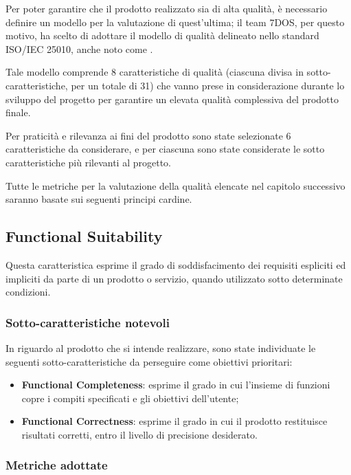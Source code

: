 Per poter garantire che il prodotto realizzato sia di alta qualità, è necessario definire un modello per la valutazione di quest'ultima; il team 7DOS, per questo motivo, ha scelto di adottare il modello di qualità delineato nello standard ISO/IEC 25010, anche noto come .

Tale modello comprende 8 caratteristiche di qualità (ciascuna divisa in sotto-caratteristiche, per un totale di 31) che vanno prese in considerazione durante lo sviluppo del progetto per garantire un elevata qualità complessiva del prodotto finale.

Per praticità e rilevanza ai fini del prodotto sono state selezionate 6 caratteristiche da considerare, e per ciascuna sono state considerate le sotto caratteristiche più rilevanti al progetto. 

Tutte le metriche per la valutazione della qualità elencate nel capitolo successivo saranno basate sui seguenti principi cardine.

\subsection{Functional Suitability}
Questa caratteristica esprime il grado di soddisfacimento dei requisiti espliciti ed impliciti da parte di un prodotto o servizio, quando utilizzato sotto determinate condizioni.
\subsubsection{Sotto-caratteristiche notevoli}
In riguardo al prodotto che si intende realizzare, sono state individuate le seguenti sotto-caratteristiche da perseguire come obiettivi prioritari: 
\begin{itemize}
	\item{\textbf{Functional Completeness}}: esprime il grado in cui l'insieme di funzioni copre i compiti specificati e gli obiettivi dell'utente;
	\item{\textbf{Functional Correctness}}: esprime il grado in cui il prodotto restituisce risultati corretti, entro il livello di precisione desiderato.
\end{itemize}
\subsubsection{Metriche adottate} 
